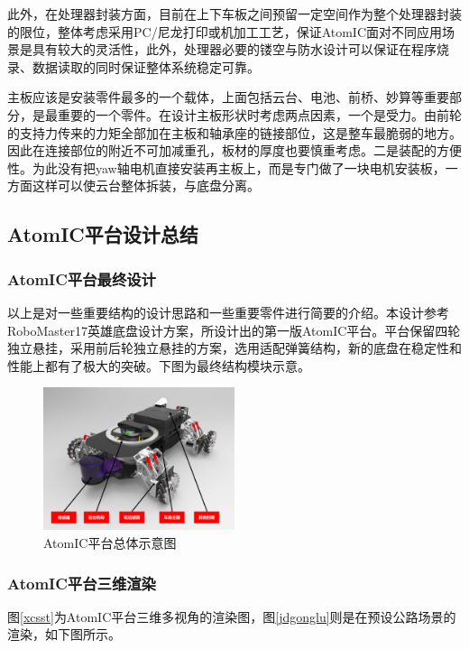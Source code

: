 此外，在处理器封装方面，目前在上下车板之间预留一定空间作为整个处理器封装的限位，整体考虑采用PC/尼龙打印或机加工工艺，保证AtomIC面对不同应用场景是具有较大的灵活性，此外，处理器必要的镂空与防水设计可以保证在程序烧录、数据读取的同时保证整体系统稳定可靠。

主板应该是安装零件最多的一个载体，上面包括云台、电池、前桥、妙算等重要部分，是最重要的一个零件。在设计主板形状时考虑两点因素，一个是受力。由前轮的支持力传来的力矩全部加在主板和轴承座的链接部位，这是整车最脆弱的地方。因此在连接部位的附近不可加减重孔，板材的厚度也要慎重考虑。二是装配的方便性。为此没有把yaw轴电机直接安装再主板上，而是专门做了一块电机安装板，一方面这样可以使云台整体拆装，与底盘分离。

\subsection{AtomIC平台设计总结}

\subsubsection{AtomIC平台最终设计}

以上是对一些重要结构的设计思路和一些重要零件进行简要的介绍。本设计参考RoboMaster17英雄底盘设计方案，所设计出的第一版AtomIC平台。平台保留四轮独立悬挂，采用前后轮独立悬挂的方案，选用适配弹簧结构，新的底盘在稳定性和性能上都有了极大的突破。下图为最终结构模块示意。

\begin{figure}[htbp]
	\centering
	\includegraphics[width = 0.5\textwidth]{fig/overview.png}
	\caption{AtomIC平台总体示意图}
	\label{overview}
\end{figure}

\subsubsection{AtomIC平台三维渲染}

图\ref{xcsst}为AtomIC平台三维多视角的渲染图，图\ref{jdgonglu}则是在预设公路场景的渲染，如下图所示。

